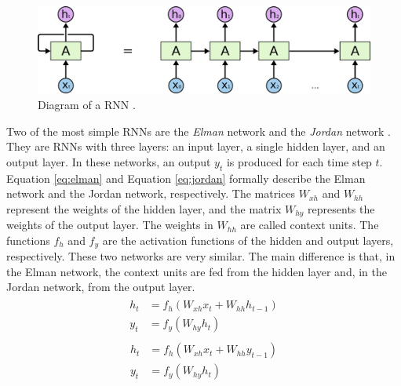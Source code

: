 \begin{figure}[!h]
\centering
\vspace{0.5cm}
\includegraphics[width=0.9\columnwidth]{imgs/background/rnn.png}
\caption{Diagram of a RNN \cite{olah2015understanding}.}
\label{fig:rnn}
\end{figure}

Two of the most simple RNNs are the \textit{Elman} network \cite{elman1990finding} and the \textit{Jordan} network \cite{jordan1986}. They are RNNs with three layers: an input layer, a single hidden layer, and an output layer. In these networks, an output $y_t$ is produced for each time step $t$. Equation \ref{eq:elman} and Equation \ref{eq:jordan} formally describe the Elman network and the Jordan network, respectively. The matrices $W_{xh}$ and $W_{hh}$ represent the weights of the hidden layer, and the matrix $W_{hy}$ represents the weights of the output layer. The weights in $W_{hh}$ are called context units. The functions $f_h$ and $f_y$ are the activation functions of the hidden and output layers, respectively. These two networks are very similar. The main difference is that, in the Elman network, the context units are fed from the hidden layer and, in the Jordan network, from the output layer.
\begin{align}
\begin{split}
    h_t &= f_h(W_{xh}x_t + W_{hh}h_{t-1}) \\
    y_t &= f_y(W_{hy}h_t)
\end{split}
\label{eq:elman}
\end{align}
\begin{align}
\begin{split}
    h_t &= f_h(W_{xh}x_t + W_{hh}y_{t-1}) \\
    y_t &= f_y(W_{hy}h_t)
\end{split}
\label{eq:jordan}
\end{align}

